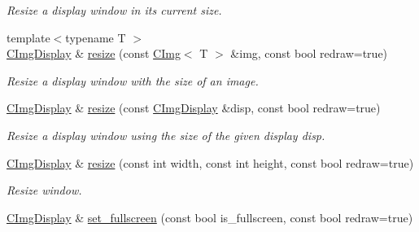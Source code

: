 \begin{DoxyCompactItemize}
\begin{DoxyCompactList}\small\item\em Resize a display window in its current size. \item\end{DoxyCompactList}\item 
{\footnotesize template$<$typename T $>$ }\\\hyperlink{structcimg__library_1_1CImgDisplay}{CImgDisplay} \& \hyperlink{structcimg__library_1_1CImgDisplay_afee064d94e1ec2e764af537fbee30d13}{resize} (const \hyperlink{structcimg__library_1_1CImg}{CImg}$<$ T $>$ \&img, const bool redraw=true)
\begin{DoxyCompactList}\small\item\em Resize a display window with the size of an image. \item\end{DoxyCompactList}\item 
\hypertarget{structcimg__library_1_1CImgDisplay_af4d082c39b75c096acb3fee6cda89b19}{
\hyperlink{structcimg__library_1_1CImgDisplay}{CImgDisplay} \& \hyperlink{structcimg__library_1_1CImgDisplay_af4d082c39b75c096acb3fee6cda89b19}{resize} (const \hyperlink{structcimg__library_1_1CImgDisplay}{CImgDisplay} \&disp, const bool redraw=true)}
\label{structcimg__library_1_1CImgDisplay_af4d082c39b75c096acb3fee6cda89b19}

\begin{DoxyCompactList}\small\item\em Resize a display window using the size of the given display {\ttfamily disp}. \item\end{DoxyCompactList}\item 
\hypertarget{structcimg__library_1_1CImgDisplay_a4fe0da6092c184682ff767dd5b83bbc5}{
\hyperlink{structcimg__library_1_1CImgDisplay}{CImgDisplay} \& \hyperlink{structcimg__library_1_1CImgDisplay_a4fe0da6092c184682ff767dd5b83bbc5}{resize} (const int width, const int height, const bool redraw=true)}
\label{structcimg__library_1_1CImgDisplay_a4fe0da6092c184682ff767dd5b83bbc5}

\begin{DoxyCompactList}\small\item\em Resize window. \item\end{DoxyCompactList}\item 
\hypertarget{structcimg__library_1_1CImgDisplay_a773481c59a3938e6de939a1531b13f01}{
\hyperlink{structcimg__library_1_1CImgDisplay}{CImgDisplay} \& \hyperlink{structcimg__library_1_1CImgDisplay_a773481c59a3938e6de939a1531b13f01}{set\_\-fullscreen} (const bool is\_\-fullscreen, const bool redraw=true)}
\label{structcimg__library_1_1CImgDisplay_a773481c59a3938e6de939a1531b13f01}


\end{DoxyCompactItemize}
